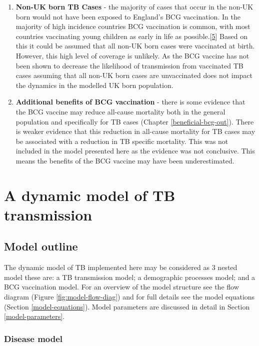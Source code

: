 \documentclass[11pt,twoside]{bristolthesis}
\begin{document}
\begin{enumerate}
  \item
    \textbf{Non-UK born TB Cases} - the majority of cases that occur in the non-UK born would not have been exposed to England's BCG vaccination. In the majority of high incidence countries BCG vaccination is common, with most countries vaccinating young children as early in life as possible.{[}\protect\hyperlink{ref-Zwerling2011a}{5}{]} Based on this it could be assumed that all non-UK born cases were vaccinated at birth. However, this high level of coverage is unlikely. As the BCG vaccine has not been shown to decrease the likelihood of transmission from vaccinated TB cases assuming that all non-UK born cases are unvaccinated does not impact the dynamics in the modelled UK born population.
  \item
    \textbf{Additional benefits of BCG vaccination} - there is some evidence that the BCG vaccine may reduce all-cause mortality both in the general population and specifically for TB cases (Chapter \ref{beneficial-bcg-out}). There is weaker evidence that this reduction in all-cause mortality for TB cases may be associated with a reduction in TB specific mortality. This was not included in the model presented here as the evidence was not conclusive. This means the benefits of the BCG vaccine may have been underestimated.
  \end{enumerate}
  \hypertarget{a-dynamic-model-of-tb-transmission}{%
  \section{A dynamic model of TB transmission}\label{a-dynamic-model-of-tb-transmission}}
  
  \hypertarget{model-outline}{%
  \subsection{Model outline}\label{model-outline}}
  
  The dynamic model of TB implemented here may be considered as 3 nested model these are: a TB transmission model; a demographic processes model; and a BCG vaccination model. For an overview of the model structure see the flow diagram (Figure \ref{fig:model-flow-diag}) and for full details see the model equations (Section \ref{model-equations}). Model parameters are discussed in detail in Section \ref{model-parameters}.
  
  \hypertarget{disease-model}{%
  \subsubsection{Disease model}\label{disease-model}}
  
\end{document}
